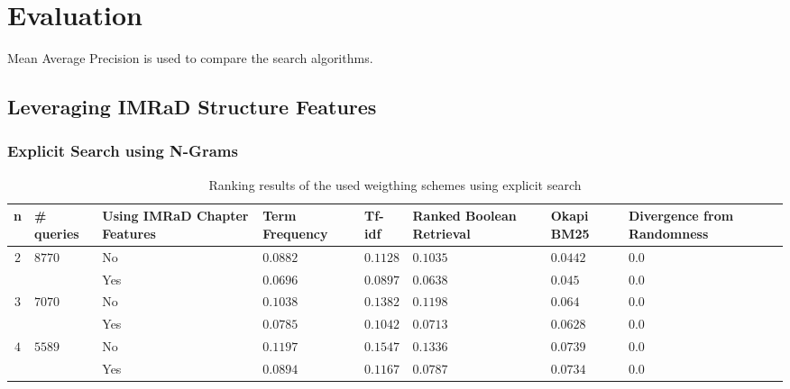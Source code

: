 \chapter{Evaluation}
\label{cha:evaluation}
Mean Average Precision is used to compare the search algorithms.

\section{Leveraging IMRaD Structure Features}

\subsection{Explicit Search using N-Grams}

\begin{table}
  \begin{adjustwidth}{-2cm}{}
    \begin{tabular}{ c C{1.5cm} C{2.1cm} C{2.1cm} C{2.1cm} C{2.1cm} C{2.1cm} C{2.1cm} }
      \toprule
      \textbf{n} & \textbf{\# queries} & \textbf{Using IMRaD Chapter Features} & \textbf{Term Frequency} & \textbf{Tf-idf} & \textbf{Ranked Boolean Retrieval} & \textbf{Okapi BM25} & \textbf{Divergence from Randomness} \\ \midrule
       &  & No  & $0.0882$ & $0.1128$ & $0.1035$ & $0.0442$ & $0.0$  \\
                                                    && Yes & $0.0696$ & $0.0897$ & $0.0638$ & $0.045$  & $0.0$  \\ \midrule
       &  & No  & $0.1038$ & $0.1382$ & $0.1198$ & $0.064$  & $0.0$  \\
                                                    && Yes & $0.0785$ & $0.1042$ & $0.0713$ & $0.0628$ & $0.0$  \\ \midrule
       &  & No  & $0.1197$ & $0.1547$ & $0.1336$ & $0.0739$ & $0.0$  \\
                                                    && Yes & $0.0894$ & $0.1167$ & $0.0787$ & $0.0734$ & $0.0$  \\
      \bottomrule
    \end{tabular}
  \caption[Ranking results with explicit search]{Ranking results of the used weigthing schemes using explicit search}
  \label{tbl:ranking_result_explicit}
  \end{adjustwidth}
\end{table}

